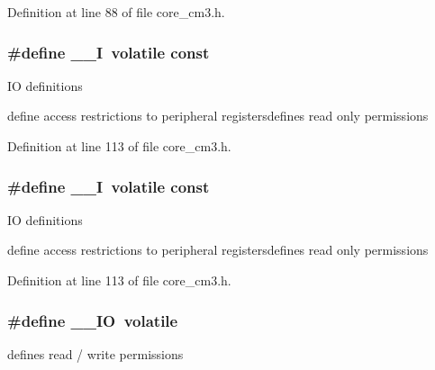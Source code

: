 Definition at line 88 of file core\+\_\+cm3.\+h.

\subsubsection[{\texorpdfstring{\+\_\+\+\_\+I}{__I}}]{\setlength{\rightskip}{0pt plus 5cm}\#define \+\_\+\+\_\+I~volatile const}\hypertarget{group___c_m_s_i_s___c_m3__core__definitions_gaf63697ed9952cc71e1225efe205f6cd3}{}\label{group___c_m_s_i_s___c_m3__core__definitions_gaf63697ed9952cc71e1225efe205f6cd3}
IO definitions

define access restrictions to peripheral registersdefines \textquotesingle{}read only\textquotesingle{} permissions 

Definition at line 113 of file core\+\_\+cm3.\+h.

\subsubsection[{\texorpdfstring{\+\_\+\+\_\+I}{__I}}]{\setlength{\rightskip}{0pt plus 5cm}\#define \+\_\+\+\_\+I~volatile const}\hypertarget{group___c_m_s_i_s___c_m3__core__definitions_gaf63697ed9952cc71e1225efe205f6cd3}{}\label{group___c_m_s_i_s___c_m3__core__definitions_gaf63697ed9952cc71e1225efe205f6cd3}
IO definitions

define access restrictions to peripheral registersdefines \textquotesingle{}read only\textquotesingle{} permissions 

Definition at line 113 of file core\+\_\+cm3.\+h.

\subsubsection[{\texorpdfstring{\+\_\+\+\_\+\+IO}{__IO}}]{\setlength{\rightskip}{0pt plus 5cm}\#define \+\_\+\+\_\+\+IO~volatile}\hypertarget{group___c_m_s_i_s___c_m3__core__definitions_gaec43007d9998a0a0e01faede4133d6be}{}\label{group___c_m_s_i_s___c_m3__core__definitions_gaec43007d9998a0a0e01faede4133d6be}
defines \textquotesingle{}read / write\textquotesingle{} permissions 

